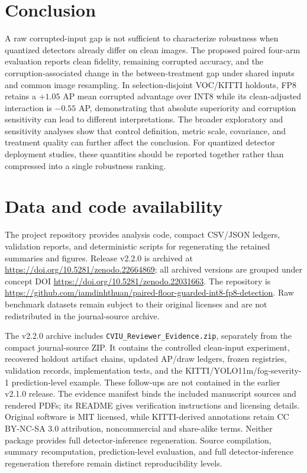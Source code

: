 \documentclass[a4paper,fleqn]{cas-dc}
\begin{document}
\section{Conclusion}
\label{sec:conclusion}

A raw corrupted-input gap is not sufficient to characterize robustness when quantized detectors already differ on clean images. The proposed paired four-arm evaluation reports clean fidelity, remaining corrupted accuracy, and the corruption-associated change in the between-treatment gap under shared inputs and common image resampling. In selection-disjoint VOC/KITTI holdouts, FP8 retains a $+1.05$ AP mean corrupted advantage over INT8 while its clean-adjusted interaction is $-0.55$ AP, demonstrating that absolute superiority and corruption sensitivity can lead to different interpretations. The broader exploratory and sensitivity analyses show that control definition, metric scale, covariance, and treatment quality can further affect the conclusion. For quantized detector deployment studies, these quantities should be reported together rather than compressed into a single robustness ranking.

\FloatBarrier

\section*{Data and code availability}

The project repository provides analysis code, compact CSV/JSON ledgers, validation reports, and deterministic scripts for regenerating the retained summaries and figures. Release v2.2.0 is archived at \url{https://doi.org/10.5281/zenodo.22664869}; all archived versions are grouped under concept DOI \url{https://doi.org/10.5281/zenodo.22031663}. The repository is \url{https://github.com/iamdinhthuan/paired-floor-guarded-int8-fp8-detection}. Raw benchmark datasets remain subject to their original licenses and are not redistributed in the journal-source archive.

The v2.2.0 archive includes \nolinkurl{CVIU_Reviewer_Evidence.zip}, separately from the compact journal-source ZIP. It contains the controlled clean-input experiment, recovered holdout artifact chains, updated AP/draw ledgers, frozen registries, validation records, implementation tests, and the KITTI/YOLO11m/fog-severity-1 prediction-level example. These follow-ups are not contained in the earlier v2.1.0 release. The evidence manifest binds the included manuscript sources and rendered PDFs; its README gives verification instructions and licensing details. Original software is MIT licensed, while KITTI-derived annotations retain CC BY-NC-SA 3.0 attribution, noncommercial and share-alike terms. Neither package provides full detector-inference regeneration. Source compilation, summary recomputation, prediction-level evaluation, and full detector-inference regeneration therefore remain distinct reproducibility levels.
\end{document}
